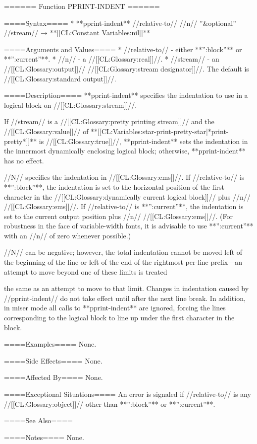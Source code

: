 ====== Function PPRINT-INDENT ======

====Syntax====
  * **pprint-indent** //relative-to// //n// ''&optional'' //stream// → **[[CL:Constant Variables:nil]]**

====Arguments and Values====
  * //relative-to// - either **'':block''** or **'':current''**.
  * //n// - a //[[CL:Glossary:real]]//.
  * //stream// - an //[[CL:Glossary:output]]// //[[CL:Glossary:stream designator]]//. The default is //[[CL:Glossary:standard output]]//.

====Description====
**pprint-indent** specifies the indentation to use in a logical block on //[[CL:Glossary:stream]]//.

If //stream// is a //[[CL:Glossary:pretty printing stream]]// and the //[[CL:Glossary:value]]// of **[[CL:Variables:star-print-pretty-star|*print-pretty*]]** is //[[CL:Glossary:true]]//, **pprint-indent** sets the indentation in the innermost dynamically enclosing logical block; otherwise, **pprint-indent** has no effect.

//N// specifies the indentation in //[[CL:Glossary:ems]]//. If //relative-to// is **'':block''**, the indentation is set to the horizontal position of the first character in the //[[CL:Glossary:dynamically current logical block]]// plus //n// //[[CL:Glossary:ems]]//. If //relative-to// is **'':current''**, the indentation is set to the current output position plus //n// //[[CL:Glossary:ems]]//. (For robustness in the face of variable-width fonts, it is advisable to use **'':current''** with an //n// of zero whenever possible.)

//N// can be negative; however, the total indentation cannot be moved left of the beginning of the line or left of the end of the rightmost per-line prefix---an attempt to move beyond one of these limits is treated

the same as an attempt to move to that limit. Changes in indentation caused by //pprint-indent// do not take effect until after the next line break. In addition, in miser mode all calls to **pprint-indent** are ignored, forcing the lines corresponding to the logical block to line up under the first character in the block.

====Examples====
None.

====Side Effects====
None.

====Affected By====
None.

====Exceptional Situations====
An error is signaled if //relative-to// is any //[[CL:Glossary:object]]// other than **'':block''** or **'':current''**.

====See Also====
{\secref\TildeI}

====Notes====
None.

 
